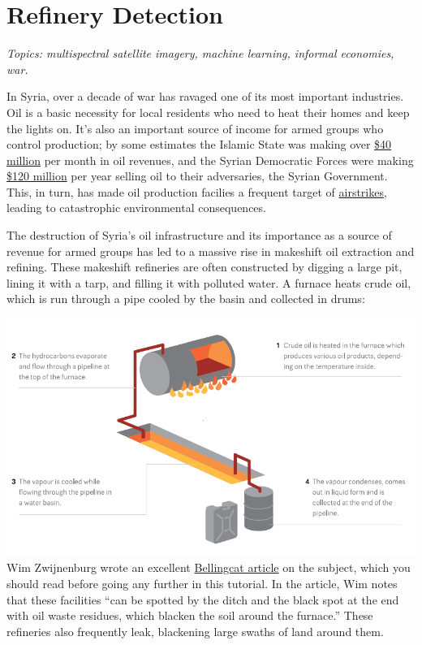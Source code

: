\documentclass[
  letterpaper,
  DIV=11,
  numbers=noendperiod]{scrreprt}
\begin{document}
\hypertarget{refinery-detection}{%
\chapter*{Refinery Detection}\label{refinery-detection}}


\emph{Topics: multispectral satellite imagery, machine learning,
informal economies, war.}

In Syria, over a decade of war has ravaged one of its most important
industries. Oil is a basic necessity for local residents who need to
heat their homes and keep the lights on. It's also an important source
of income for armed groups who control production; by some estimates the
Islamic State was making over
\href{https://www.rand.org/blog/2017/10/oil-extortion-still-paying-off-for-isis.html}{\$40
million} per month in oil revenues, and the Syrian Democratic Forces
were making
\href{https://www.al-monitor.com/originals/2021/08/syrian-government-kurds-discuss-plans-oil-trade}{\$120
million} per year selling oil to their adversaries, the Syrian
Government. This, in turn, has made oil production facilies a frequent
target of
\href{https://www.gov.uk/government/publications/british-forces-air-strikes-in-iraq-monthly-list/january-2015}{airstrikes},
leading to catastrophic environmental consequences.

The destruction of Syria's oil infrastructure and its importance as a
source of revenue for armed groups has led to a massive rise in
makeshift oil extraction and refining. These makeshift refineries are
often constructed by digging a large pit, lining it with a tarp, and
filling it with polluted water. A furnace heats crude oil, which is run
through a pipe cooled by the basin and collected in drums:

\includegraphics{./images/makeshift-refining.png} Wim Zwijnenburg wrote
an excellent
\href{https://www.bellingcat.com/news/2020/04/24/dying-to-keep-warm-oil-trade-and-makeshift-refining-in-north-west-syria/}{Bellingcat
article} on the subject, which you should read before going any further
in this tutorial. In the article, Wim notes that these facilities ``can
be spotted by the ditch and the black spot at the end with oil waste
residues, which blacken the soil around the furnace.'' These refineries
also frequently leak, blackening large swaths of land around them.
\end{document}

